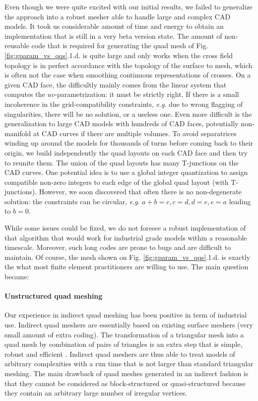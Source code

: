 \documentclass[AMA,STIX1COL]{WileyNJD-v2}
\newcommand{\eg}{\textit{e}.\textit{g}. }
\newcommand\rfig[1]{Fig. \ref{#1}}
\begin{document}
{Even though we were quite excited with our initial results, we failed
to generalize the approach into a robust mesher able to handle large and
complex CAD models.  It took us considerable amount of time and energy to
obtain an implementation that is still in a very beta version
state.
The amount of non-reusable code that is required for generating the quad mesh
of \rfig{fig:gparam_vs_qqs}.1.d. is quite large and only works when the cross
field topology is in perfect accordance with the topology of the surface to
mesh, which is often not the case when smoothing continuous representations of
crosses. On a given CAD face, the difficultly mainly comes from the linear system that computes
the $uv$-parametrization: it must be strictly right. If there is a small
incoherence in the grid-compatibility constraints, \eg due to wrong flagging
of singularities, there will be no solution, or a useless one.
Even more difficult is the generalization to large CAD models with hundreds of
CAD faces, potentially non-manifold at CAD curves if there are multiple volumes.
To avoid separatrices winding up around the models for thousands of turns before
coming back to their origin, we build independently the quad layouts on each CAD
face and then try to reunite them. The union of the quad layouts has many
T-junctions on the CAD curves. One potential idea is to use a global integer
quantization \cite{campen2015} to assign compatible non-zero integers to
each edge of the global quad layout (with T-junctions). However, we soon
discovered that often there is no non-degenerate solution: the constraints
can be circular, \eg $a+b=c, c = d, d = e, e = a$ leading to $b=0$.

While some issues could be fixed, we do not foresee a robust implementation of that algorithm that would
work for industrial grade models within a reasonable timescale.  Moreover, such
long codes are prone to bugs and are difficult to maintain.  Of course, the
mesh shown on \rfig{fig:gparam_vs_qqs}.1.d. is exactly the what most finite
element practitioners are willing to use. The main question became:

\vspace {.2cm}
\vspace {.2cm}

\paragraph{Unstructured quad meshing} 
Our experience in indirect quad meshing
\cite{blossom,delquad} has been positive in term of industrial
use. Indirect quad meshers are essentially based on existing surface
meshers (very small amount of extra coding). The
transformation of a triangular mesh into a quad mesh by combination
of pairs of triangles is an extra step that is simple, robust and
efficient \cite{blossom,frey}. Indirect quad meshers are thus able to treat 
models of arbitrary complexities with a run time that is not larger
than standard triangular meshing.
The main drawback of quad meshes generated in an indirect fashion is
that they cannot be considered as block-structured or quasi-structured
because they contain an arbitrary large number of irregular vertices.

}
\end{document}
